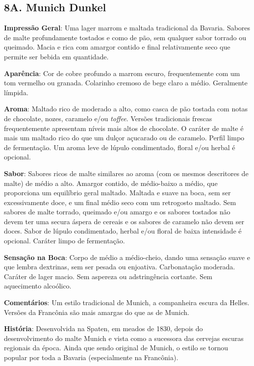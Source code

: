 \subsection*{8A. Munich Dunkel}
\textbf{Impressão Geral}: Uma lager marrom e maltada tradicional da Bavaria. Sabores de malte profundamente tostados e como de pão, sem qualquer sabor torrado ou queimado. Macia e rica com amargor contido e final relativamente seco que permite ser bebida em quantidade.

\textbf{Aparência}: Cor de cobre profundo a marrom escuro, frequentemente com um tom vermelho ou granada. Colarinho cremoso de bege claro a médio. Geralmente límpida.

\textbf{Aroma}: Maltado rico de moderado a alto, como casca de pão tostada com notas de chocolate, nozes, caramelo e/ou \textit{toffee}. Versões tradicionais frescas frequentemente apresentam níveis mais altos de chocolate. O caráter de malte é mais um maltado rico do que um dulçor açucarado ou de caramelo. Perfil limpo de fermentação. Um aroma leve de lúpulo condimentado, floral e/ou herbal é opcional.

\textbf{Sabor}: Sabores ricos de malte similares ao aroma (com os mesmos descritores de malte) de médio a alto. Amargor contido, de médio-baixo a médio, que proporciona um equilíbrio geral maltado. Maltada e suave na boca, sem ser excessivamente doce, e um final médio seco com um retrogosto maltado. Sem sabores de malte torrado, queimado e/ou amargo e os sabores tostados não devem ter uma secura áspera de cereais e os sabores de caramelo não devem ser doces. Sabor de lúpulo condimentado, herbal e/ou floral de baixa intensidade é opcional. Caráter limpo de fermentação.

\textbf{Sensação na Boca}: Corpo de médio a médio-cheio, dando uma sensação suave e que lembra dextrinas, sem ser pesada ou enjoativa. Carbonatação moderada. Caráter de lager macio. Sem aspereza ou adstringência cortante. Sem aquecimento alcoólico.

\textbf{Comentários}: Um estilo tradicional de Munich, a companheira escura da Helles. Versões da Francônia são mais amargas do que as de Munich.

\textbf{História}: Desenvolvida na Spaten, em meados de 1830, depois do desenvolvimento do malte Munich e vista como a sucessora das cervejas escuras regionais da época. Ainda que sendo original de Munich, o estilo se tornou popular por toda a Bavaria (especialmente na Francônia).

